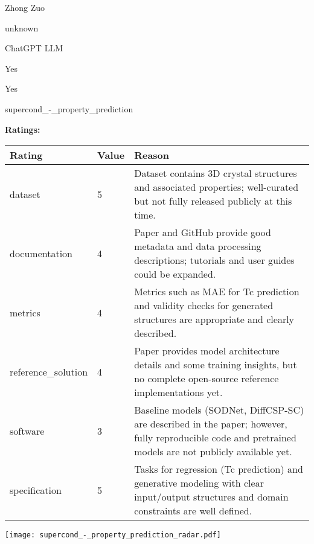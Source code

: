 {{\begin{description}[labelwidth=4cm, labelsep=1em, leftmargin=4cm, itemsep=0.1em, parsep=0em]
  \item[contact.name:] Zhong Zuo
  \item[contact.email:] unknown
  \item[results.links.name:] ChatGPT LLM
  \item[fair.reproducible:] Yes
  \item[fair.benchmark\_ready:] Yes
  \item[id:] supercond\_-\_property\_prediction
  \item[Citations:] \cite{neurips2024_c4e3b55e}
\end{description}

{\bf Ratings:} ~ \\

\begin{tabular}{p{} p{} p{}}
\hline
Rating & Value & Reason \\
\hline
dataset & 5 & Dataset contains 3D crystal structures and associated properties; well-curated but
not fully released publicly at this time.
 \\
documentation & 4 & Paper and GitHub provide good metadata and data processing descriptions; tutorials
and user guides could be expanded.
 \\
metrics & 4 & Metrics such as MAE for Tc prediction and validity checks for generated structures
are appropriate and clearly described.
 \\
reference\_solution & 4 & Paper provides model architecture details and some training insights, but no
complete open-source reference implementations yet.
 \\
software & 3 & Baseline models (SODNet, DiffCSP-SC) are described in the paper; however,
fully reproducible code and pretrained models are not publicly available yet.
 \\
specification & 5 & Tasks for regression (Tc prediction) and generative modeling with clear input/output
structures and domain constraints are well defined.
 \\
\hline
\end{tabular}

\texttt{[image: supercond\_-\_property\_prediction\_radar.pdf]}
}}
\clearpage